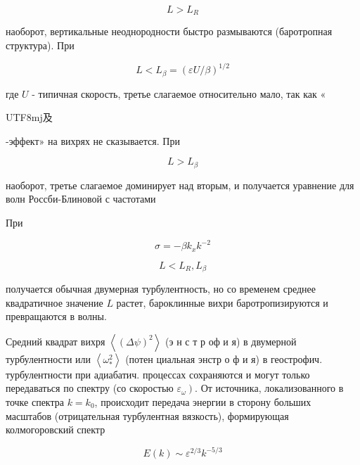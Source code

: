 \documentclass[10pt]{article}
\begin{document}
\[

L>L_{R}

\]



наоборот, вертикальные неоднородности быстро размываются (баротропная структура). При



\[

L<L_{\beta}=(\varepsilon U / \beta)^{1 / 2}

\]



где $U$ - типичная скорость, третье слагаемое относительно мало, так как «\begin{CJK}{UTF8}{mj}及\end{CJK}-эффект» на вихрях не сказывается. При



\[

L>L_{\beta}

\]



наоборот, третье слагаемое доминирует над вторым, и получается уравнение для волн Россби-Блиновой с частотами



При



\[

\sigma=-\beta k_{x} k^{-2}

\]



\[

L<L_{R}, L_{\beta}

\]



получается обычная двумерная турбулентность, но со временем среднее квадратичное значение $L$ растет, бароклинные вихри баротропизируются и превращаются в волны.



Средний квадрат вихря $\left\langle(\Delta \psi)^{2}\right\rangle$ (э н с т р оф и я) в двумерной турбулентности или $\left\langle\omega_{*}^{2}\right\rangle$ (потен циальная энстр о ф и я) в геострофич. турбулентности при адиабатич. процессах сохраняются и могут только передаваться по спектру (со скоростью $\left.\varepsilon_{\omega}\right)$. От источника, локализованного в точке спектра $k=k_{0}$, происходит передача энергии в сторону больших масштабов (отрицательная турбулентная вязкость), формирующая колмогоровский спектр



\[

E(k) \sim \varepsilon^{2 / 3} k^{-5 / 3}

\]
\end{document}
